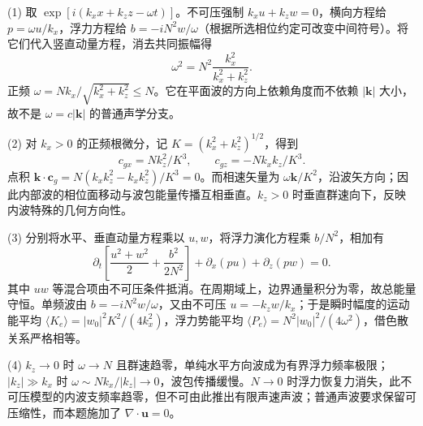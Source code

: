 (1) 取 \(\exp[i(k_xx+k_zz-\omega t)]\)。不可压强制 \(k_xu+k_zw=0\)，横向方程给 \(p=\omega u/k_x\)，浮力方程给 \(b=-iN^2w/\omega\)（根据所选相位约定可改变中间符号）。将它们代入竖直动量方程，消去共同振幅得
\[
\boxed{\omega^2=N^2\frac{k_x^2}{k_x^2+k_z^2}}.
\]
正频 \(\omega=N k_x/\sqrt{k_x^2+k_z^2}\le N\)。它在平面波的方向上依赖角度而不依赖 \(|\boldsymbol k|\) 大小，故不是 \(\omega=c|\boldsymbol k|\) 的普通声学分支。

(2) 对 \(k_x>0\) 的正频根微分，记 \(K=(k_x^2+k_z^2)^{1/2}\)，得到
\[
\boxed{c_{gx}=N k_z^2/K^3,\qquad c_{gz}=-N k_xk_z/K^3}.
\]
点积 \(\boldsymbol k\cdot\boldsymbol c_g=N(k_xk_z^2-k_xk_z^2)/K^3=0\)。而相速矢量为 \(\omega\boldsymbol k/K^2\)，沿波矢方向；因此内部波的相位面移动与波包能量传播互相垂直。\(k_z>0\) 时垂直群速向下，反映内波特殊的几何方向性。

(3) 分别将水平、垂直动量方程乘以 \(u,w\)，将浮力演化方程乘 \(b/N^2\)，相加有
\[
\boxed{\partial_t\left[\frac{u^2+w^2}{2}+\frac{b^2}{2N^2}\right]
+\partial_x(pu)+\partial_z(pw)=0}.
\]
其中 \(uw\) 等混合项由不可压条件抵消。在周期域上，边界通量积分为零，故总能量守恒。单频波由 \(b=-iN^2w/\omega\)，又由不可压 \(u=-k_zw/k_x\)；于是瞬时幅度的运动能平均
\(\langle K_e\rangle=|w_0|^2K^2/(4k_x^2)\)，浮力势能平均 \(\langle P_e\rangle=N^2|w_0|^2/(4\omega^2)\)，借色散关系严格相等。

(4) \(k_z\to0\) 时 \(\omega\to N\) 且群速趋零，单纯水平方向波成为有界浮力频率极限；\(|k_z|\gg k_x\) 时 \(\omega\sim Nk_x/|k_z|\to0\)，波包传播缓慢。\(N\to0\) 时浮力恢复力消失，此不可压模型的内波支频率趋零，但不可由此推出有限声速声波；普通声波要求保留可压缩性，而本题施加了 \(\nabla\cdot\boldsymbol u=0\)。
